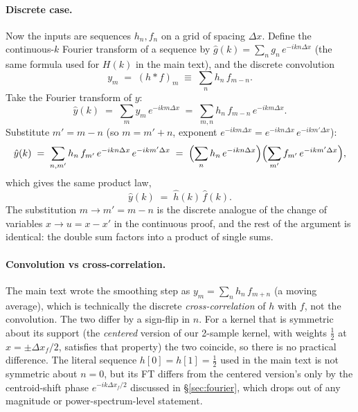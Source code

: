 \documentclass[12pt]{article}
\begin{document}
\paragraph{Discrete case.}
Now the inputs are sequences $h_n, f_n$ on a grid of spacing
$\Delta x$. Define the continuous-$k$ Fourier transform of a sequence
by $\hat g(k) = \sum_n g_n\,e^{-ikn\Delta x}$ (the same formula used
for $H(k)$ in the main text), and the discrete convolution
\begin{equation}
  y_m \;=\; (h*f)_m \;\equiv\; \sum_n h_n\,f_{m-n}.
\end{equation}
Take the Fourier transform of $y$:
\begin{equation}
  \hat y(k) \;=\; \sum_m y_m\,e^{-ikm\Delta x}
            \;=\; \sum_{m,n} h_n\,f_{m-n}\,e^{-ikm\Delta x}.
\end{equation}
Substitute $m' = m-n$ (so $m = m'+n$, exponent
$e^{-ikm\Delta x} = e^{-ikn\Delta x}\,e^{-ikm'\Delta x}$):
\begin{equation}
  \hat y(k) \;=\; \sum_{n,m'} h_n\,f_{m'}\,e^{-ikn\Delta x}\,e^{-ikm'\Delta x}
            \;=\; \Bigl(\sum_n h_n\,e^{-ikn\Delta x}\Bigr)
                  \Bigl(\sum_{m'} f_{m'}\,e^{-ikm'\Delta x}\Bigr),
\end{equation}
which gives the same product law,
\begin{equation}\label{eq:convthm-disc}
  \boxed{\;\hat y(k) \;=\; \hat h(k)\,\hat f(k).\;}
\end{equation}
The substitution $m \to m'=m-n$ is the discrete analogue of the change
of variables $x \to u=x-x'$ in the continuous proof, and the rest of
the argument is identical: the double sum factors into a product of
single sums.

\paragraph{Convolution vs cross-correlation.}
The main text wrote the smoothing step as $y_m=\sum_n h_n\,f_{m+n}$
(a moving average), which is technically the discrete
\emph{cross-correlation} of $h$ with $f$, not the convolution. The two
differ by a sign-flip in $n$. For a kernel that is symmetric about its
support (the \emph{centered} version of our 2-sample kernel, with
weights $\tfrac12$ at $x=\pm\Delta x_f/2$, satisfies that property)
the two coincide, so there is no practical difference. The literal
sequence $h[0]=h[1]=\tfrac12$ used in the main text is not symmetric
about $n=0$, but its FT differs from the centered version's only by
the centroid-shift phase $e^{-ik\Delta x_f/2}$ discussed in
\S\ref{sec:fourier}, which drops out of any magnitude or
power-spectrum-level statement.
\end{document}
